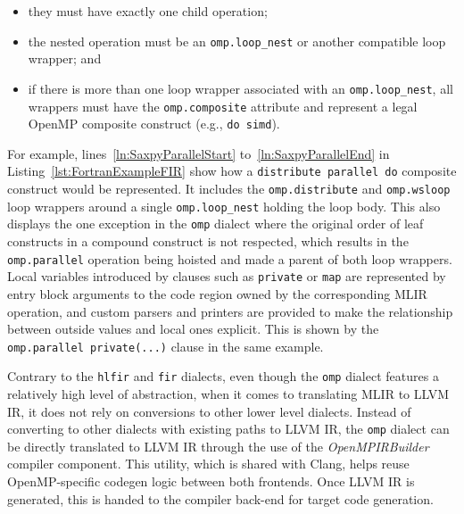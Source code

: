 \documentclass[acmtog,natbib=false]{acmart}
\newcommand{\code}[1]{\texttt{#1}\xspace}
\begin{document}
\begin{itemize}
    \item they must have exactly one child operation;
    \item the nested operation must be an \code{omp.loop\_nest} or another compatible loop wrapper; and
    \item if there is more than one loop wrapper associated with an \code{omp.loop\_nest}, all wrappers must have the \code{omp.composite} attribute and represent a legal OpenMP composite construct (e.g., \code{do simd}).
\end{itemize}

For example, lines~\ref{ln:SaxpyParallelStart} to~\ref{ln:SaxpyParallelEnd} in Listing~\ref{lst:FortranExampleFIR} show how a \code{distribute parallel do} composite construct would be represented.
It includes the \code{omp.distribute} and \code{omp.wsloop} loop wrappers around a single \code{omp.loop\_nest} holding the loop body.
This also displays the one exception in the \code{omp} dialect where the original order of leaf constructs in a compound construct is not respected, which results in the \code{omp.parallel} operation being hoisted and made a parent of both loop wrappers.
Local variables introduced by clauses such as \code{private} or \code{map} are represented by entry block arguments to the code region owned by the corresponding \ac{MLIR} operation, and custom parsers and printers are provided to make the relationship between outside values and local ones explicit.
This is shown by the \code{omp.parallel private(...)} clause in the same example.

Contrary to the \code{hlfir} and \code{fir} dialects, even though the \code{omp} dialect features a relatively high level of abstraction, when it comes to translating \ac{MLIR} to LLVM \ac{IR}, it does not rely on conversions to other lower level dialects.
Instead of converting to other dialects with existing paths to LLVM \ac{IR}, the \code{omp} dialect can be directly translated to LLVM \ac{IR} through the use of the \textit{OpenMPIRBuilder} compiler component.
This utility, which is shared with Clang, helps reuse OpenMP-specific codegen logic between both frontends.
Once LLVM \ac{IR} is generated, this is handed to the compiler back-end for target code generation.

\end{document}
